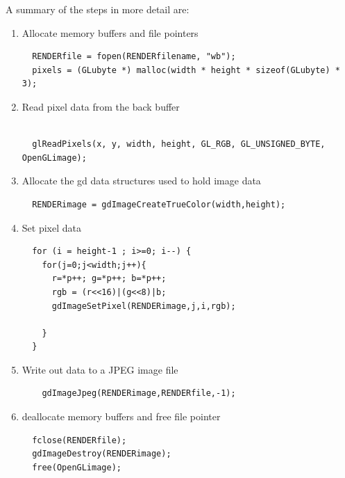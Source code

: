 \documentclass[11pt,twoside]{book}
\begin{document}
A summary of the steps in more detail are:
\begin{enumerate}
\item Allocate memory buffers and file pointers
\begin{verbatim}
  RENDERfile = fopen(RENDERfilename, "wb");
  pixels = (GLubyte *) malloc(width * height * sizeof(GLubyte) * 3);
\end{verbatim}

\item Read pixel data from the back buffer
\begin{verbatim}

  glReadPixels(x, y, width, height, GL_RGB, GL_UNSIGNED_BYTE, OpenGLimage);
\end{verbatim}
\item Allocate the gd data structures used to hold image data
\begin{verbatim}
  RENDERimage = gdImageCreateTrueColor(width,height);
\end{verbatim}

\item Set pixel data

\begin{verbatim}
  for (i = height-1 ; i>=0; i--) {
    for(j=0;j<width;j++){
      r=*p++; g=*p++; b=*p++;
      rgb = (r<<16)|(g<<8)|b;
      gdImageSetPixel(RENDERimage,j,i,rgb);

    }
  }
\end{verbatim}

\item Write out data to a JPEG image file

\begin{verbatim}
    gdImageJpeg(RENDERimage,RENDERfile,-1);
\end{verbatim}

\item deallocate memory buffers and free file pointer

\begin{verbatim}
  fclose(RENDERfile);
  gdImageDestroy(RENDERimage);
  free(OpenGLimage);
\end{verbatim}

\end{enumerate}
\end{document}
